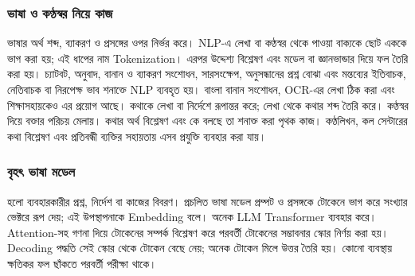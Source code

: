 \begin{topicbody}
\subsubsection{ভাষা ও কণ্ঠস্বর নিয়ে কাজ}
ভাষার অর্থ শব্দ, ব্যাকরণ ও প্রসঙ্গের ওপর নির্ভর করে। NLP-এ লেখা বা কণ্ঠস্বর থেকে পাওয়া বাক্যকে ছোট এককে ভাগ করা হয়; এই ধাপের নাম Tokenization। এরপর উদ্দেশ্য বিশ্লেষণ এবং মডেল বা জ্ঞানভান্ডার দিয়ে ফল তৈরি করা হয়। চ্যাটবট, অনুবাদ, বানান ও ব্যাকরণ সংশোধন, সারসংক্ষেপ, অনুসন্ধানের প্রশ্ন বোঝা এবং মন্তব্যের ইতিবাচক, নেতিবাচক বা নিরপেক্ষ ভাব শনাক্তে NLP ব্যবহৃত হয়। বাংলা বানান সংশোধন, OCR-এর লেখা ঠিক করা এবং শিক্ষাসহায়কেও এর প্রয়োগ আছে।
 কথাকে লেখা বা নির্দেশে রূপান্তর করে;  লেখা থেকে কথার শব্দ তৈরি করে।  কণ্ঠস্বর দিয়ে বক্তার পরিচয় মেলায়। কথার অর্থ বিশ্লেষণ এবং কে বলছে তা শনাক্ত করা পৃথক কাজ। কণ্ঠলিখন, কল সেন্টারের কথা বিশ্লেষণ এবং প্রতিবন্ধী ব্যক্তির সহায়তায় এসব প্রযুক্তি ব্যবহার করা যায়।
\subsubsection{বৃহৎ ভাষা মডেল}
 হলো ব্যবহারকারীর প্রশ্ন, নির্দেশ বা কাজের বিবরণ। প্রচলিত ভাষা মডেল প্রম্পট ও প্রসঙ্গকে টোকেনে ভাগ করে সংখ্যার ভেক্টরে রূপ দেয়; এই উপস্থাপনাকে Embedding বলে। অনেক LLM Transformer ব্যবহার করে। Attention-সহ গণনা দিয়ে টোকেনের সম্পর্ক বিশ্লেষণ করে পরবর্তী টোকেনের সম্ভাবনার স্কোর নির্ণয় করা হয়। Decoding পদ্ধতি সেই স্কোর থেকে টোকেন বেছে নেয়; অনেক টোকেন মিলে উত্তর তৈরি হয়। কোনো ব্যবস্থায় ক্ষতিকর ফল ছাঁকতে পরবর্তী পরীক্ষা থাকে।



\end{topicbody}
